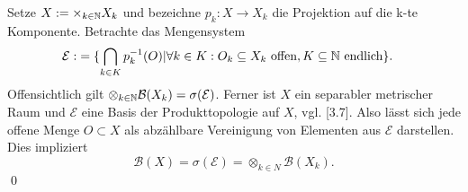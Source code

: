 \begin{proof*}
    Setze $X:= \times_{k \in \mathbb{N}}X_k$ und bezeichne $p_k: X \to X_k$ die Projektion auf die k-te Komponente. Betrachte das Mengensystem
    \begin{align*}
        \mathcal{E} :&= \{ \bigcap_{k \in K}p_k^{-1}(O) | \forall k \in K: O_k \subseteq X_k \text{ offen}, K \subseteq \mathbb{N} \text{ endlich}\}. 
    \end{align*}
    Offensichtlich gilt $\otimes_{k \in \mathbb{N}}\mathcal{B}(X_k) = \sigma(\mathcal{E})$. 
    Ferner ist $X$ ein separabler metrischer Raum und $\mathcal{E}$ eine Basis der Produkttopologie auf $X$, vgl. \cite{querenburg}[3.7]. 
    Also lässt sich jede offene Menge $O \subset X$ als abzählbare Vereinigung von Elementen aus $\mathcal{E}$ darstellen.  
    Dies impliziert 
    $$
    \mathcal{B}(X) = \sigma(\mathcal{E}) = \otimes_{k \in N}\mathcal{B}(X_k).
    $$
    \qed
\end{proof*}
